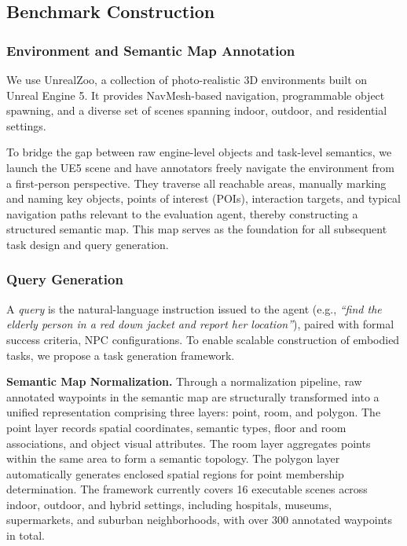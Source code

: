 \subsection{Benchmark Construction}
\label{sec:construction}

\subsubsection{Environment and Semantic Map Annotation}
\label{sec:env-semantic}

We use UnrealZoo, a collection of photo-realistic 3D environments built on Unreal Engine 5. It provides NavMesh-based navigation, programmable object spawning, and a diverse set of scenes spanning indoor, outdoor, and residential settings. 


To bridge the gap between raw engine-level objects and task-level semantics, we launch the UE5 scene and have annotators freely navigate the environment from a first-person perspective. They traverse all reachable areas, manually marking and naming key objects, points of interest (POIs), interaction targets, and typical navigation paths relevant to the evaluation agent, thereby constructing a structured semantic map. This map serves as the foundation for all subsequent task design and query generation.

\subsubsection{Query Generation}
\label{sec:query-gen}

A \textit{query} is the natural-language instruction issued to the agent (e.g., \textit{``find the elderly person in a red down jacket and report her location''}), paired with formal success criteria, NPC configurations. To enable scalable construction of embodied tasks, we propose a task generation framework.

\textbf{Semantic Map Normalization.} Through a normalization pipeline, raw annotated waypoints in the semantic map are structurally transformed into a unified representation comprising three layers: point, room, and polygon. The point layer records spatial coordinates, semantic types, floor and room associations, and object visual attributes. The room layer aggregates points within the same area to form a semantic topology. The polygon layer automatically generates enclosed spatial regions for point membership determination. The framework currently covers 16 executable scenes across indoor, outdoor, and hybrid settings, including hospitals, museums, supermarkets, and suburban neighborhoods, with over 300 annotated waypoints in total.

